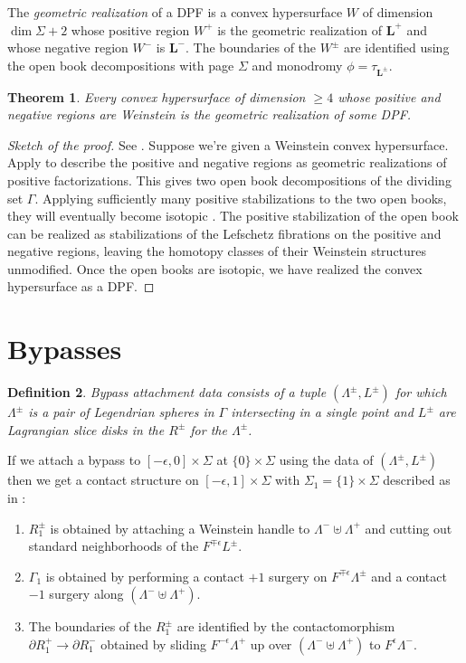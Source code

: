 \documentclass[11pt]{amsart}
\newcommand{\thicc}[1]{\pmb{#1}}
\newcommand{\Leg}{\Lambda}
\newcommand{\be}{\begin{enumerate}}
\newcommand{\ee}{\end{enumerate}}
\newcommand{\LagTuple}{\thicc{L}}
\newcommand{\hypersurface}{\Sigma}
\newcommand{\posRegion}{R^{+}}
\newcommand{\negRegion}{R^{-}}
\newcommand{\posNegRegion}{R^{\pm}}
\newcommand{\Lag}{L}
\newcommand{\posNegLag}{\Lag^{\pm}}
\newcommand{\posLeg}{\Leg^{+}}
\newcommand{\negLeg}{\Leg^{-}}
\newcommand{\posNegLeg}{\Leg^{\pm}}
\newcommand{\divSet}{\Gamma}
\newtheorem{thm}{Theorem}[section]
\newtheorem{defn}[thm]{Definition}
\begin{document}
The \emph{geometric realization} of a DPF is a convex hypersurface $W$ of dimension $\dim \Sigma + 2$ whose positive region $W^{+}$ is the geometric realization of $\LagTuple^{+}$ and whose negative region $W^{-}$ is $\LagTuple^{-}$. The boundaries of the $W^{\pm}$ are identified using the open book decompositions with page $\Sigma$ and monodromy $\phi = \tau_{\LagTuple^{\pm}}$.

\begin{thm}
Every convex hypersurface of dimension $\geq 4$ whose positive and negative regions are Weinstein is the geometric realization of some DPF.
\end{thm}

\begin{proof}[Sketch of the proof]
See \cite{Breen:Folded}. Suppose we're given a Weinstein convex hypersurface. Apply \cite{BHH:GirouxCorrespondence, GirouxPardon} to describe the positive and negative regions as geometric realizations of positive factorizations. This gives two open book decompositions of the dividing set $\Gamma$. Applying sufficiently many positive stabilizations to the two open books, they will eventually become isotopic \cite{BHH:GirouxCorrespondence}. The positive stabilization of the open book can be realized as stabilizations of the Lefschetz fibrations on the positive and negative regions, leaving the homotopy classes of their Weinstein structures unmodified. Once the open books are isotopic, we have realized the convex hypersurface as a DPF.
\end{proof}

\section{Bypasses}

\begin{defn}
Bypass attachment data consists of a tuple $(\posNegLeg, \posNegLag)$ for which $\posNegLeg$ is a pair of Legendrian spheres in $\divSet$ intersecting in a single point and $\posNegLag$ are Lagrangian slice disks in the $\posNegRegion$ for the $\posNegLeg$.
\end{defn}

If we attach a bypass to $[-\epsilon, 0] \times \hypersurface$ at $\{ 0 \} \times \hypersurface$ using the data of $(\posNegLeg, \posNegLag)$ then we get a contact structure on $[-\epsilon, 1] \times \hypersurface$ with $\hypersurface_{1} = \{1\} \times \hypersurface$ described as in \cite[Theorem 5.1.3]{HH:Bypass}:
\be
\item $\posNegRegion_{1}$ is obtained by attaching a Weinstein handle to $\negLeg \uplus \posLeg$ and cutting out standard neighborhoods of the $F^{\mp \epsilon}\posNegLag$.
\item $\divSet_{1}$ is obtained by performing a contact $+1$ surgery on $F^{\mp\epsilon}\posNegLeg$ and a contact $-1$ surgery along $(\negLeg \uplus \posLeg)$.
\item The boundaries of the $\posNegRegion_{1}$ are identified by the contactomorphism $\partial \posRegion_{1} \rightarrow \partial \negRegion_{1}$ obtained by sliding $F^{-\epsilon}\posLeg$ up over $(\negLeg \uplus \posLeg)$ to $F^{\epsilon}\negLeg$.
\ee
\end{document}
